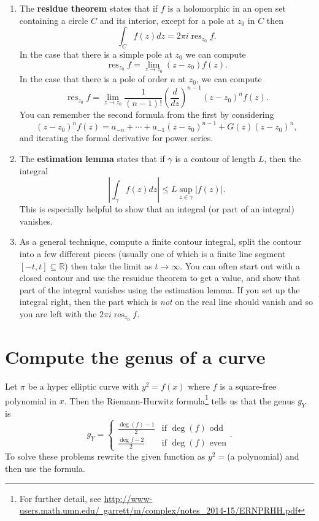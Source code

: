 \documentclass[10pt]{article}
\DeclareMathOperator{\res}{res}
\begin{document}
\begin{enumerate}
	\item The \textbf{residue theorem} states that if $f$ is a holomorphic in an open set containing a circle $C$ and its interior, except for a pole at $z_0$ in $C$ then 
	\[ \int_C f(z) dz = 2\pi i \res_{z_0} f.\]
	In the case that there is a simple pole at $z_0$ we can compute
	\[ \res_{z_0} f = \lim_{z \rightarrow z_0} (z-z_0) f(z).\]
	In the case that there is a pole of order $n$ at $z_0$, we can compute
	\[ \res_{z_0} f = \lim_{z \rightarrow z_0} \frac{1}{(n-1)!} \left ( \frac{d}{dz}\right )^{n-1} (z-z_0)^n f(z).\]
	You can remember the second formula from the first by considering \[(z-z_0)^n f(z) = a_{-n} +  \cdots + a_{-1} (z-z_0)^{n-1} + G(z) (z-z_0)^n,\] and iterating the formal derivative for power series.
	
	\item The \textbf{estimation lemma} states that if $\gamma$ is a contour of length $L$, 
	then the integral \[ \left | \int_{\gamma} f(z) dz \right | \leq L \sup_{z \in \gamma} | f(z) |.\]
	This is especially helpful to show that an integral (or part of an integral) vanishes.
	
	\item As a general technique, compute a finite contour integral, split the contour into a few different pieces (usually one of which is a finite line segment $[-t,t] \subseteq \mathbb{R}$) then take the limit as $t \rightarrow \infty$.
	You can often start out with a closed contour and use the resuidue theorem to get a value, and show
	that part of the integral vanishes using the estimation lemma. If you set up the integral right, 
	then the part which is \emph{not} on the real line should vanish and so you are left with 
	the $2\pi i \res_{z_0} f$.
	
\end{enumerate}

\section{Compute the genus of a curve}
Let $\pi$ be a hyper elliptic curve with $y^2 = f(x)$ where $f$ is a square-free polynomial in $x$. Then the Riemann-Hurwitz formula\footnote{For further detail, see \href{PG's notes}{http://www-users.math.umn.edu/~garrett/m/complex/notes\_2014-15/ERNPRHH.pdf}} tells us that the genus $g_Y$ is 
\[g_Y  = \begin{cases} \frac{\deg(f)-1}{2} & \text{if } \deg(f) \text{ odd} \\ \frac{\deg{f}-2}{2} & \text{if } \deg(f) \text{ even}  \end{cases}. \]
To solve these problems rewrite the given function as $y^2 = $(a polynomial) and then use the formula.
\end{document}
